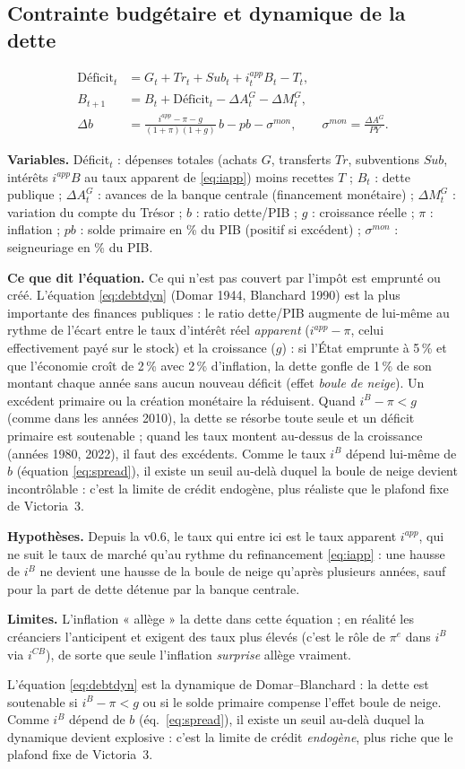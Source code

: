 \documentclass[11pt,a4paper]{article}
\newcommand{\variables}{\par\noindent\textbf{Variables.} }
\newcommand{\sens}{\par\noindent\textbf{Ce que dit l'équation.} }
\newcommand{\hyp}{\par\noindent\textbf{Hypothèses.} }
\newcommand{\limites}{\par\noindent\textbf{Limites.} }
\begin{document}
\subsection{Contrainte budgétaire et dynamique de la dette}
\begin{align}
\text{Déficit}_t &= G_t + Tr_t + Sub_t + i^{app}_t B_t - T_t ,\\
B_{t+1} &= B_t + \text{Déficit}_t - \Delta A^G_t - \Delta M^G_t , \label{eq:gbc}\\
\Delta b &= \frac{i^{app} - \pi - g}{(1+\pi)(1+g)}\, b - pb - \sigma^{mon},\qquad \sigma^{mon} = \frac{\Delta A^G}{PY}. \label{eq:debtdyn}
\end{align}
\begin{lecture}
\variables Déficit$_t$ : dépenses totales (achats $G$, transferts $Tr$, subventions $Sub$, intérêts $i^{app}B$ au taux apparent de \eqref{eq:iapp}) moins recettes $T$ ; $B_t$ : dette publique ; $\Delta A^G_t$ : avances de la banque centrale (financement monétaire) ; $\Delta M^G_t$ : variation du compte du Trésor ; $b$ : ratio dette/PIB ; $g$ : croissance réelle ; $\pi$ : inflation ; $pb$ : solde primaire en \% du PIB (positif si excédent) ; $\sigma^{mon}$ : seigneuriage en \% du PIB.
\sens Ce qui n'est pas couvert par l'impôt est emprunté ou créé. L'équation \eqref{eq:debtdyn} (Domar 1944, Blanchard 1990) est la plus importante des finances publiques : le ratio dette/PIB augmente de lui-même au rythme de l'écart entre le taux d'intérêt réel \emph{apparent} ($i^{app}-\pi$, celui effectivement payé sur le stock) et la croissance ($g$) : si l'État emprunte à 5\,\% et que l'économie croît de 2\,\% avec 2\,\% d'inflation, la dette gonfle de 1\,\% de son montant chaque année sans aucun nouveau déficit (effet \emph{boule de neige}). Un excédent primaire ou la création monétaire la réduisent. Quand $i^B-\pi<g$ (comme dans les années 2010), la dette se résorbe toute seule et un déficit primaire est soutenable ; quand les taux montent au-dessus de la croissance (années 1980, 2022), il faut des excédents. Comme le taux $i^B$ dépend lui-même de $b$ (équation \eqref{eq:spread}), il existe un seuil au-delà duquel la boule de neige devient incontrôlable : c'est la limite de crédit endogène, plus réaliste que le plafond fixe de Victoria~3.
\hyp Depuis la v0.6, le taux qui entre ici est le taux apparent $i^{app}$, qui ne suit le taux de marché qu'au rythme du refinancement \eqref{eq:iapp} : une hausse de $i^B$ ne devient une hausse de la boule de neige qu'après plusieurs années, sauf pour la part de dette détenue par la banque centrale.
\limites L'inflation « allège » la dette dans cette équation ; en réalité les créanciers l'anticipent et exigent des taux plus élevés (c'est le rôle de $\pi^e$ dans $i^B$ via $i^{CB}$), de sorte que seule l'inflation \emph{surprise} allège vraiment.
\end{lecture}
L'équation \eqref{eq:debtdyn} est la dynamique de Domar--Blanchard : la dette est soutenable si $i^B - \pi < g$ ou si le solde primaire compense l'effet boule de neige. Comme $i^B$ dépend de $b$ (éq.~\eqref{eq:spread}), il existe un seuil au-delà duquel la dynamique devient explosive : c'est la limite de crédit \emph{endogène}, plus riche que le plafond fixe de Victoria~3.
\end{document}
